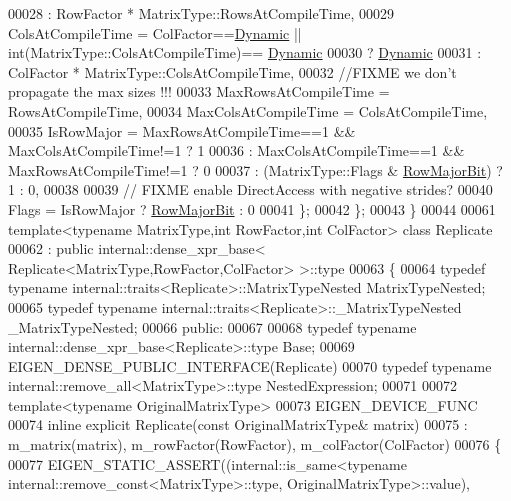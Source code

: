 \begin{DoxyCode}
00028                       : RowFactor * MatrixType::RowsAtCompileTime,
00029     ColsAtCompileTime = ColFactor==\hyperlink{namespace_eigen_ad81fa7195215a0ce30017dfac309f0b2}{Dynamic} || int(MatrixType::ColsAtCompileTime)==
      \hyperlink{namespace_eigen_ad81fa7195215a0ce30017dfac309f0b2}{Dynamic}
00030                       ? \hyperlink{namespace_eigen_ad81fa7195215a0ce30017dfac309f0b2}{Dynamic}
00031                       : ColFactor * MatrixType::ColsAtCompileTime,
00032    \textcolor{comment}{//FIXME we don't propagate the max sizes !!!}
00033     MaxRowsAtCompileTime = RowsAtCompileTime,
00034     MaxColsAtCompileTime = ColsAtCompileTime,
00035     IsRowMajor = MaxRowsAtCompileTime==1 && MaxColsAtCompileTime!=1 ? 1
00036                : MaxColsAtCompileTime==1 && MaxRowsAtCompileTime!=1 ? 0
00037                : (MatrixType::Flags & \hyperlink{group__flags_gae4f56c2a60bbe4bd2e44c5b19cbe8762}{RowMajorBit}) ? 1 : 0,
00038     
00039     \textcolor{comment}{// FIXME enable DirectAccess with negative strides?}
00040     Flags = IsRowMajor ? \hyperlink{group__flags_gae4f56c2a60bbe4bd2e44c5b19cbe8762}{RowMajorBit} : 0
00041   \};
00042 \};
00043 \}
00044 
00061 \textcolor{keyword}{template}<\textcolor{keyword}{typename} MatrixType,\textcolor{keywordtype}{int} RowFactor,\textcolor{keywordtype}{int} ColFactor> \textcolor{keyword}{class }Replicate
00062   : \textcolor{keyword}{public} internal::dense\_xpr\_base< Replicate<MatrixType,RowFactor,ColFactor> >::type
00063 \{
00064     \textcolor{keyword}{typedef} \textcolor{keyword}{typename} internal::traits<Replicate>::MatrixTypeNested MatrixTypeNested;
00065     \textcolor{keyword}{typedef} \textcolor{keyword}{typename} internal::traits<Replicate>::\_MatrixTypeNested \_MatrixTypeNested;
00066   \textcolor{keyword}{public}:
00067 
00068     \textcolor{keyword}{typedef} \textcolor{keyword}{typename} internal::dense\_xpr\_base<Replicate>::type Base;
00069     EIGEN\_DENSE\_PUBLIC\_INTERFACE(Replicate)
00070     \textcolor{keyword}{typedef} \textcolor{keyword}{typename} internal::remove\_all<MatrixType>::type NestedExpression;
00071 
00072     \textcolor{keyword}{template}<\textcolor{keyword}{typename} OriginalMatrixType>
00073     EIGEN\_DEVICE\_FUNC
00074     \textcolor{keyword}{inline} \textcolor{keyword}{explicit} Replicate(\textcolor{keyword}{const} OriginalMatrixType& matrix)
00075       : m\_matrix(matrix), m\_rowFactor(RowFactor), m\_colFactor(ColFactor)
00076     \{
00077       EIGEN\_STATIC\_ASSERT((internal::is\_same<\textcolor{keyword}{typename} internal::remove\_const<MatrixType>::type,
      OriginalMatrixType>::value),

\end{DoxyCode}
